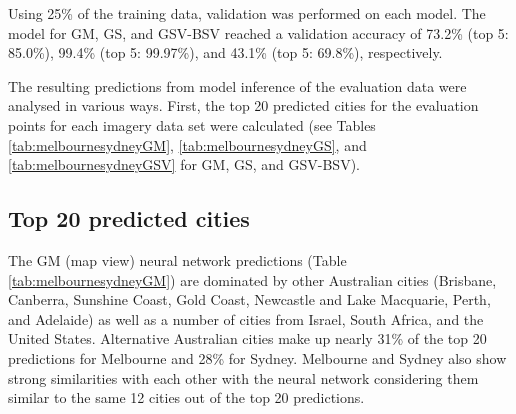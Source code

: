 \documentclass[10pt,letterpaper]{article}
\begin{document}
Using 25\% of the training data, validation was performed on each model. The model for GM, GS, and GSV-BSV reached a validation accuracy of 73.2\% (top 5: 85.0\%), 99.4\% (top 5: 99.97\%), and 43.1\% (top 5: 69.8\%), respectively.

The resulting predictions from model inference of the evaluation data were analysed in various ways. First, the top 20 predicted cities for the evaluation points for each imagery data set were calculated (see Tables \ref{tab:melbournesydneyGM}, \ref{tab:melbournesydneyGS}, and \ref{tab:melbournesydneyGSV} for GM, GS, and GSV-BSV).

\subsection*{Top 20 predicted cities} 

The GM (map view) neural network predictions (Table \ref{tab:melbournesydneyGM}) are dominated by other Australian cities (Brisbane, Canberra, Sunshine Coast, Gold Coast, Newcastle and Lake Macquarie, Perth, and Adelaide) as well as a number of cities from Israel, South Africa, and the United States. Alternative Australian cities make up nearly 31\% of the top 20 predictions for Melbourne and 28\% for Sydney. Melbourne and Sydney also show strong similarities with each other with the neural network considering them similar to the same 12 cities out of the top 20 predictions.
\end{document}
